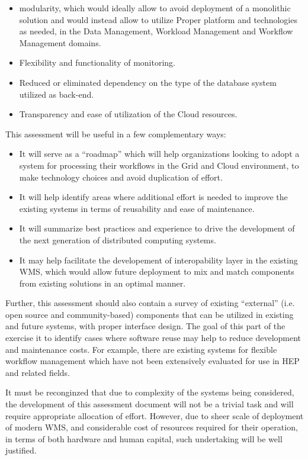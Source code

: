 \begin{itemize}
\item modularity, which would ideally allow to avoid deployment of a monolithic solution and would instead allow to
utilize Proper platform and technologies as needed, in the Data Management, Workload Management and Workflow Management domains.
\item Flexibility and functionality of monitoring.
\item Reduced or eliminated dependency on the type of the database system utilized as back-end.
\item Transparency and ease of utilization of the Cloud resources.
\end{itemize}
This assessment will be useful in a few complementary ways:
\begin{itemize}
\item It will serve as a ``roadmap'' which will help organizations looking to adopt a system for processing their workflows in the Grid and Cloud environment,
to make technology choices and avoid duplication of effort.

\item It will help identify areas where additional effort is needed to improve the existing systems in terms of reusability and ease of maintenance.

\item It will summarize best practices and experience to drive the development of the next generation of distributed computing systems.

\item It may help facilitate the developement of interopability layer in the existing WMS, which would allow future deployment to mix and match components
from existing solutions in an optimal manner.
\end{itemize}

Further, this assessment should also contain a survey of existing ``external'' (i.e. open source and community-based) components that can be utilized
in existing and future systems,  with proper interface design. The goal of this part of the exercise it to identify cases where software reuse may help
to reduce development and maintenance costs. For example, there are existing systems for flexible workflow management which have not been
extensively evaluated for use in HEP and related fields.

It must be reconginzed that due to complexity of the systems being considered, the development of this assessment document will not be a trivial
task and will require appropriate allocation of effort. However, due to sheer scale of deployment of modern WMS, and considerable cost of resources
required for their operation, in terms of both hardware and human capital, such undertaking will be well justified.

